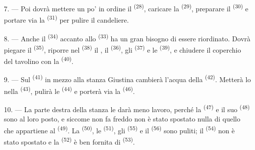 7. --- Poi dovrà mettere un po' in ordine il 
\textsuperscript{(28)}, caricare la  \textsuperscript{(29)}, preparare
il  \textsuperscript{(30)} e portare via la 
\textsuperscript{(31)} per pulire il candeliere.

\VUsaut{5.0mm}
\VUsaut{3.0mm}

8. --- Anche il  \textsuperscript{(34)} accanto allo
 \textsuperscript{(33)} ha un gran bisogno di essere riordinato.
Dovrà piegare il  \textsuperscript{(35)}, riporre nel
 \textsuperscript{(38)} il , il
 \textsuperscript{(36)}, gli  \textsuperscript{(37)} e le
 \textsuperscript{(39)}, e chiudere il coperchio del tavolino con la
 \textsuperscript{(40)}.

9. --- Sul  \textsuperscript{(41)} in mezzo alla stanza
Giustina cambierà l'acqua della  \textsuperscript{(42)}. Metterà lo
 nella  \textsuperscript{(43)}, pulirà le
 \textsuperscript{(44)} e porterà via la 
\textsuperscript{(46)}.

10. --- La parte destra della stanza le darà meno lavoro, perché la
 \textsuperscript{(47)} e il suo 
\textsuperscript{(48)} sono al loro posto, e siccome non fa freddo non è stato spostato
nulla di quello che appartiene al  \textsuperscript{(49)}. La
 \textsuperscript{(50)}, le  \textsuperscript{(51)}, gli
 \textsuperscript{(55)} e il 
\textsuperscript{(56)} sono puliti; il 
\textsuperscript{(54)} non è stato spostato e la 
\textsuperscript{(52)} è ben fornita di 
\textsuperscript{(53)}.



